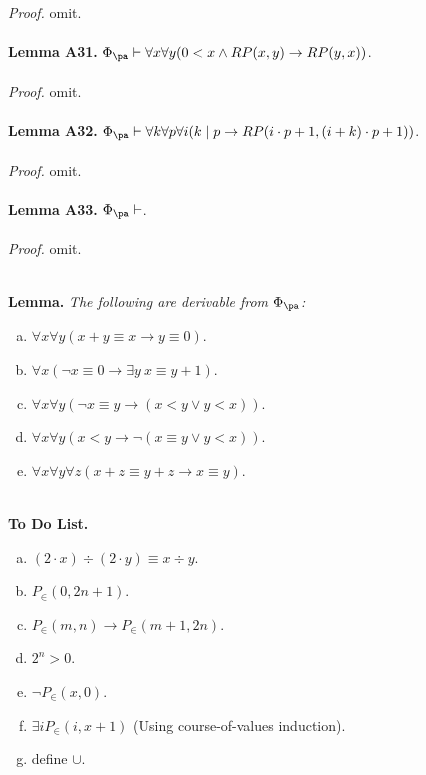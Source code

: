 \textit{Proof.} omit.\\
\ \\
\textbf{Lemma A31.} $\Phi_\pa \vdash \forall x \forall y (0 < x \land RP(x, y) \rightarrow RP(y, x))$.\\
\ \\
\textit{Proof.} omit.\\
\ \\
\textbf{Lemma A32.} $\Phi_\pa \vdash \forall k \forall p \forall i (k \mid p \rightarrow RP(i \cdot p + 1, (i + k) \cdot p + 1))$.\\
\ \\
\textit{Proof.} omit.\\
\ \\
\textbf{Lemma A33.} $\Phi_\pa \vdash $.\\
\ \\
\textit{Proof.} omit.\\
\ \\




\par\noindent \textbf{Lemma.} \emph{The following are derivable from $\Phi_\pa$:}
\begin{enumerate}[(a)]
\item $\forall x \forall y (x + y \equiv x \rightarrow y \equiv 0)$.
\item $\forall x (\neg x \equiv 0 \rightarrow \exists y \ x \equiv y + 1)$.
\item $\forall x \forall y (\neg x \equiv y \rightarrow (x < y \lor y < x))$.
%
\item $\forall x \forall y (x < y \rightarrow \neg(x \equiv y \lor y < x))$.
%
\item $\forall x \forall y \forall z (x + z \equiv y + z \rightarrow x \equiv y)$.
\end{enumerate}
\ \\
\textbf{To Do List.}
\begin{enumerate}[(a)]
\item $(2 \cdot x) \div (2 \cdot y) \equiv x \div y$.
%
\item $P_\in (0, 2n + 1)$.
%
\item $P_\in (m, n) \rightarrow P_\in (m + 1, 2n)$.
%
\item $2^n > 0$.
%
\item $\neg P_\in (x, 0)$.
%
\item $\exists i P_\in (i, x + 1)$ (Using course-of-values induction).
%
\item define $\cup$.
\end{enumerate}
